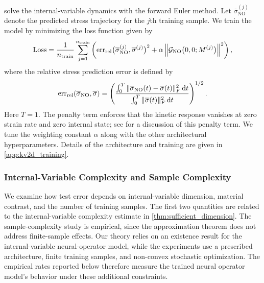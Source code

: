 \documentclass[3p, 12pt, preprint]{elsarticle}
\begin{document}
 solve the internal-variable dynamics with the forward Euler method. Let $\overline\sigma_{\mathrm{NO}}^{(j)}$ denote the predicted stress trajectory for the $j$th training sample. We train the model by minimizing the loss function given by
\begin{equation}\label{eq:loss_function}
    \mathrm{Loss}
    =
    \frac{1}{n_{\mathrm{train}}}
    \sum_{j=1}^{n_{\mathrm{train}}}
    \left(
        {\operatorname{err}_{\rm rel}}\bigl(\overline\sigma_{\mathrm{NO}}^{(j)},\overline\sigma^{(j)}\bigr)^2
        +
        \alpha\left\|{\mathcal{G}}_{\mathrm{NO}}\bigl(0,0;M^{(j)}\bigr)\right\|^2
    \right),
\end{equation}
where the relative stress prediction error is defined by
\begin{equation}\label{eq:relative_stress_error}
    {\operatorname{err}_{\rm rel}}(\overline\sigma_{\mathrm{NO}},\overline\sigma)
    =
    \left(
        \frac{\int_0^T \|\overline\sigma_{\mathrm{NO}}(t)-\overline\sigma(t)\|_F^2\,\mathrm{d}t}{\int_0^T \|\overline\sigma(t)\|_F^2\,\mathrm{d}t}
    \right)^{1/2}.
\end{equation}
Here $T=1$. The penalty term enforces that the kinetic response vanishes at zero strain rate and zero internal state; see \cite[Appendix E]{bhattacharya2025learning} for a discussion of this penalty term. We tune the weighting constant $\alpha$ along with the other architectural hyperparameters. Details of the architecture and training are given in \cref{app:kv2d_training}.

\subsubsection{Internal-Variable Complexity and Sample Complexity}\label{sssec:kv2d_model_complexity_numerical}
We examine how test error depends on internal-variable dimension, material contrast, and the number of training samples. The first two quantities are related to the internal-variable complexity estimate in \cref{thm:sufficient_dimension}. The sample-complexity study is empirical, since the approximation theorem does not address finite-sample effects. Our theory relies on an existence result for the internal-variable neural-operator model, while the experiments use a prescribed architecture, finite training samples, and non-convex stochastic optimization. The empirical rates reported below therefore measure the trained neural operator model's behavior under these additional constraints.
\end{document}
